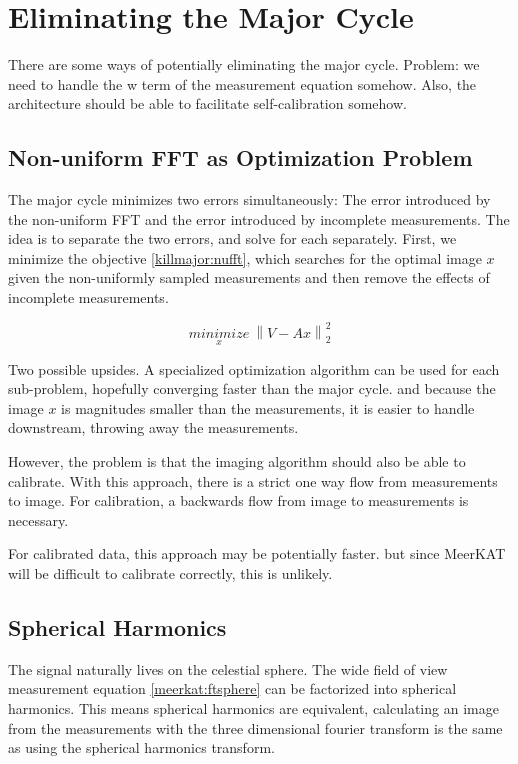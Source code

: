 \section{Eliminating the Major Cycle}\label{killmajor}

There are some ways of potentially eliminating the major cycle. Problem: we need to handle the w term of the measurement equation somehow. Also, the architecture should be able to facilitate self-calibration somehow.


\subsection{Non-uniform FFT as Optimization Problem}
The major cycle minimizes two errors simultaneously: The error introduced by the non-uniform FFT and the error introduced by incomplete measurements. The idea is to separate the two errors, and solve for each separately. First, we minimize the objective \eqref{killmajor:nufft}, which searches for the optimal image $x$ given the non-uniformly sampled measurements and then remove the effects of incomplete measurements.

\begin{equation}\label{killmajor:nufft}
\underset{x}{minimize} \: \left \| V - Ax \right \|_2^2
\end{equation}

Two possible upsides. A specialized optimization algorithm can be used for each sub-problem, hopefully converging faster than the major cycle. and because the image $x$ is magnitudes smaller than the measurements, it is easier to handle downstream, throwing away the measurements.

However, the problem is that the imaging algorithm should also be able to calibrate. With this approach, there is a strict one way flow from measurements to image. For calibration, a backwards flow from image to measurements is necessary.

For calibrated data, this approach may be potentially faster. but since MeerKAT will be difficult to calibrate correctly, this is unlikely.


\subsection{Spherical Harmonics}
The signal naturally lives on the celestial sphere. The wide field of view measurement equation \eqref{meerkat:ftsphere} can be factorized into spherical harmonics. This means spherical harmonics are equivalent, calculating an image from the measurements with the three dimensional fourier transform is the same as using the spherical harmonics transform.

